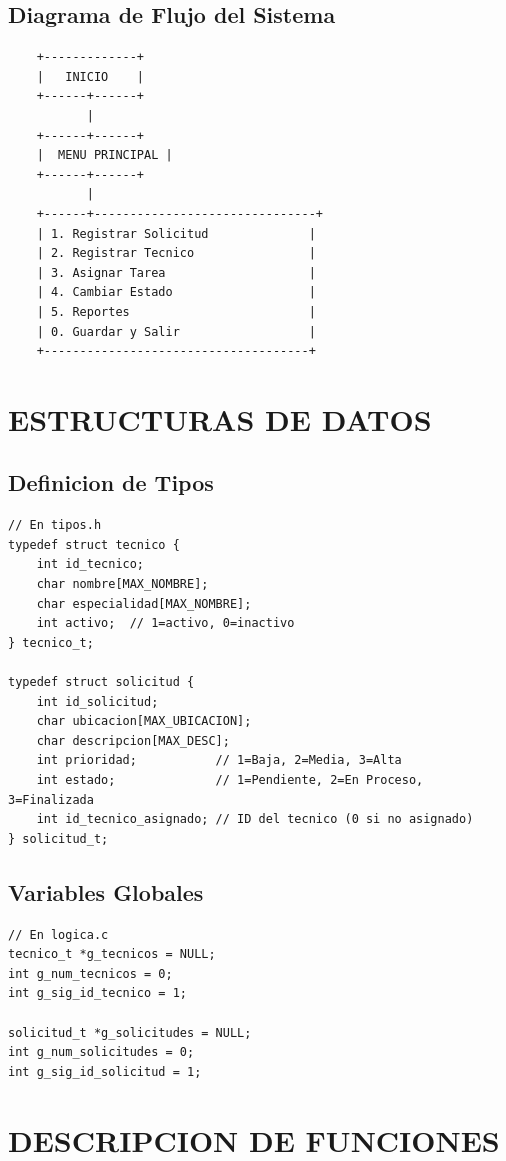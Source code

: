 \documentclass[12pt, a4paper]{article}
\begin{document}
\subsection{Diagrama de Flujo del Sistema}
\begin{verbatim}
    +-------------+
    |   INICIO    |
    +------+------+
           |
    +------+------+
    |  MENU PRINCIPAL |
    +------+------+
           |
    +------+-------------------------------+
    | 1. Registrar Solicitud              |
    | 2. Registrar Tecnico                |
    | 3. Asignar Tarea                    |
    | 4. Cambiar Estado                   |
    | 5. Reportes                         |
    | 0. Guardar y Salir                  |
    +-------------------------------------+
\end{verbatim}

\section{ESTRUCTURAS DE DATOS}

\subsection{Definicion de Tipos}
\begin{lstlisting}
// En tipos.h
typedef struct tecnico {
    int id_tecnico;
    char nombre[MAX_NOMBRE];
    char especialidad[MAX_NOMBRE];
    int activo;  // 1=activo, 0=inactivo
} tecnico_t;

typedef struct solicitud {
    int id_solicitud;
    char ubicacion[MAX_UBICACION];
    char descripcion[MAX_DESC];
    int prioridad;           // 1=Baja, 2=Media, 3=Alta
    int estado;              // 1=Pendiente, 2=En Proceso, 3=Finalizada
    int id_tecnico_asignado; // ID del tecnico (0 si no asignado)
} solicitud_t;
\end{lstlisting}

\subsection{Variables Globales}
\begin{lstlisting}
// En logica.c
tecnico_t *g_tecnicos = NULL;
int g_num_tecnicos = 0;
int g_sig_id_tecnico = 1;

solicitud_t *g_solicitudes = NULL;
int g_num_solicitudes = 0;
int g_sig_id_solicitud = 1;
\end{lstlisting}

\section{DESCRIPCION DE FUNCIONES}
\end{document}
